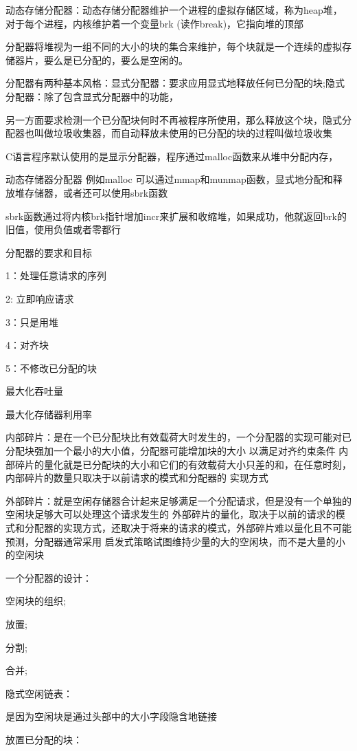 \documentclass[11pt, a4paper]{article}
\begin{document}
动态存储分配器：动态存储分配器维护一个进程的虚拟存储区域，称为heap堆，对于每个进程，内核维护着一个变量brk
(读作break)，它指向堆的顶部

分配器将堆视为一组不同的大小的块的集合来维护，每个块就是一个连续的虚拟存储器片，要么是已分配的，要么是空闲的。

分配器有两种基本风格：显式分配器：要求应用显式地释放任何已分配的块;隐式分配器：除了包含显式分配器中的功能，

另一方面要求检测一个已分配块何时不再被程序所使用，那么释放这个块，隐式分配器也叫做垃圾收集器，而自动释放未使用的已分配的块的过程叫做垃圾收集


C语言程序默认使用的是显示分配器，程序通过malloc函数来从堆中分配内存，

动态存储器分配器 例如malloc 可以通过mmap和munmap函数，显式地分配和释放堆存储器，或者还可以使用sbrk函数

sbrk函数通过将内核brk指针增加incr来扩展和收缩堆，如果成功，他就返回brk的旧值，使用负值或者零都行

分配器的要求和目标

1：处理任意请求的序列

2: 立即响应请求

3：只是用堆

4：对齐块

5：不修改已分配的块

最大化吞吐量

最大化存储器利用率


内部碎片：是在一个已分配块比有效载荷大时发生的，一个分配器的实现可能对已分配块强加一个最小的大小值，分配器可能增加块的大小
以满足对齐约束条件
内部碎片的量化就是已分配块的大小和它们的有效载荷大小只差的和，在任意时刻，内部碎片的数量只取决于以前请求的模式和分配器的
实现方式

外部碎片：就是空闲存储器合计起来足够满足一个分配请求，但是没有一个单独的空闲块足够大可以处理这个请求发生的
外部碎片的量化，取决于以前的请求的模式和分配器的实现方式，还取决于将来的请求的模式，外部碎片难以量化且不可能预测，分配器通常采用
启发式策略试图维持少量的大的空闲块，而不是大量的小的空闲块

一个分配器的设计：
	
	空闲块的组织;
	
	放置;
	
	分割;
	
	合并;
	
隐式空闲链表：
	
	是因为空闲块是通过头部中的大小字段隐含地链接


放置已分配的块：
	
\end{document}
